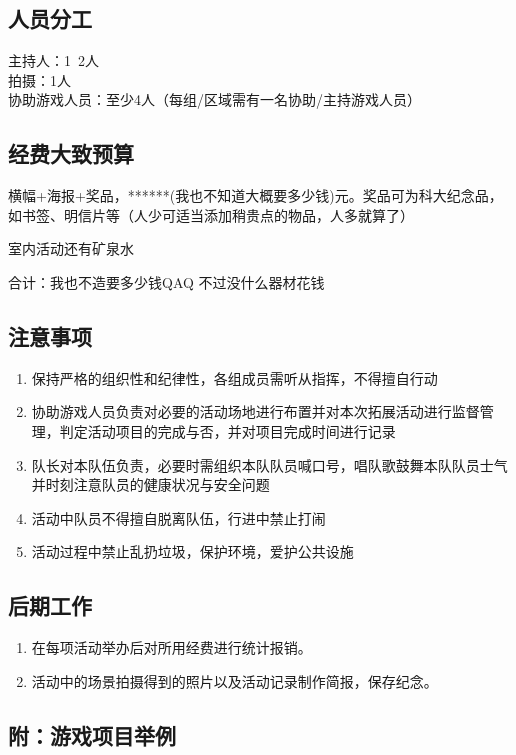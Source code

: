 \documentclass{article}
\begin{document}
\begin{CJK}{UTF8}{gbsn}
\subsection{人员分工}
主持人：1~2人\\
拍摄：1人\\
协助游戏人员：至少4人（每组/区域需有一名协助/主持游戏人员）\\

\subsection{经费大致预算}
横幅+海报+奖品，******(我也不知道大概要多少钱)元。奖品可为科大纪念品，如书签、明信片等（人少可适当添加稍贵点的物品，人多就算了）

室内活动还有矿泉水

合计：我也不造要多少钱QAQ  不过没什么器材花钱

\subsection{注意事项}
\begin{enumerate}
	\item	保持严格的组织性和纪律性，各组成员需听从指挥，不得擅自行动
	\item	协助游戏人员负责对必要的活动场地进行布置并对本次拓展活动进行监督管理，判定活动项目的完成与否，并对项目完成时间进行记录 
	\item	队长对本队伍负责，必要时需组织本队队员喊口号，唱队歌鼓舞本队队员士气并时刻注意队员的健康状况与安全问题
\item	活动中队员不得擅自脱离队伍，行进中禁止打闹
	\item	活动过程中禁止乱扔垃圾，保护环境，爱护公共设施
\end{enumerate}


\subsection{后期工作}
\begin{enumerate}
\item 在每项活动举办后对所用经费进行统计报销。
\item 活动中的场景拍摄得到的照片以及活动记录制作简报，保存纪念。
\end{enumerate}





\subsection{附：游戏项目举例}
\begin{enumerate}
	


\end{enumerate}
\end{CJK}
\end{document}

